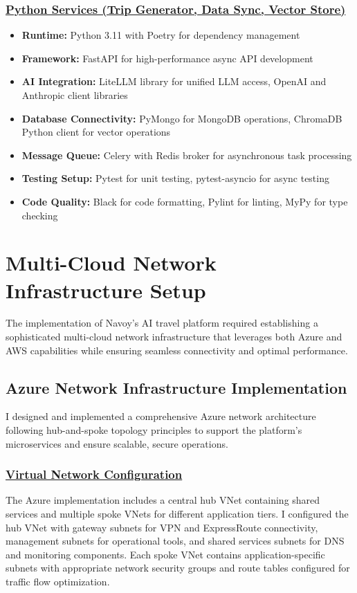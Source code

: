 \subsubsection*{\underline{Python Services (Trip Generator, Data Sync, Vector Store)}}
\begin{itemize}
    \item \textbf{Runtime:} Python 3.11 with Poetry for dependency management
    \item \textbf{Framework:} FastAPI for high-performance async API development
    \item \textbf{AI Integration:} LiteLLM library for unified LLM access, OpenAI and Anthropic client libraries
    \item \textbf{Database Connectivity:} PyMongo for MongoDB operations, ChromaDB Python client for vector operations
    \item \textbf{Message Queue:} Celery with Redis broker for asynchronous task processing
    \item \textbf{Testing Setup:} Pytest for unit testing, pytest-asyncio for async testing
    \item \textbf{Code Quality:} Black for code formatting, Pylint for linting, MyPy for type checking
\end{itemize}

\section{Multi-Cloud Network Infrastructure Setup}
The implementation of Navoy's AI travel platform required establishing a sophisticated multi-cloud network infrastructure that leverages both Azure and AWS capabilities while ensuring seamless connectivity and optimal performance.

\subsection{Azure Network Infrastructure Implementation}
I designed and implemented a comprehensive Azure network architecture following hub-and-spoke topology principles to support the platform's microservices and ensure scalable, secure operations.

\subsubsection*{\underline{Virtual Network Configuration}}
The Azure implementation includes a central hub VNet containing shared services and multiple spoke VNets for different application tiers. I configured the hub VNet with gateway subnets for VPN and ExpressRoute connectivity, management subnets for operational tools, and shared services subnets for DNS and monitoring components. Each spoke VNet contains application-specific subnets with appropriate network security groups and route tables configured for traffic flow optimization.

